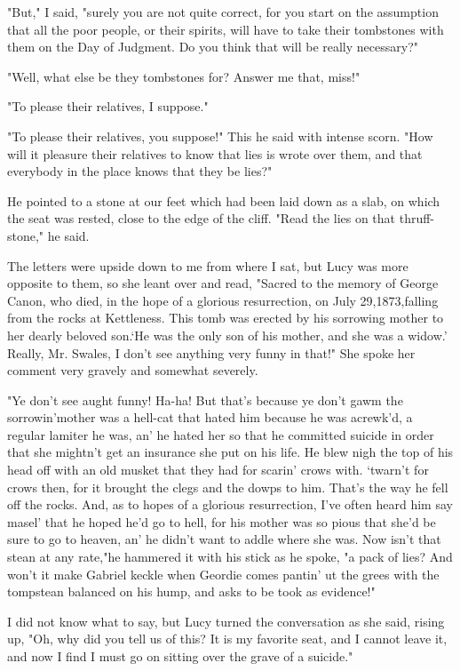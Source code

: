 "But," I said, "surely you are not quite correct, for you start on the assumption that all the poor people, or their spirits, will have to take their tombstones with them on the Day of Judgment. Do you think that will be really necessary?" 

"Well, what else be they tombstones for? Answer me that, miss!" 

"To please their relatives, I suppose." 

"To please their relatives, you suppose!" This he said with intense scorn. "How will it pleasure their relatives to know that lies is wrote over them, and that everybody in the place knows that they be lies?" 

He pointed to a stone at our feet which had been laid down as a slab, on which the seat was rested, close to the edge of the cliff. "Read the lies on that thruff-stone," he said. 

The letters were upside down to me from where I sat, but Lucy was more opposite to them, so she leant over and read, "Sacred to the memory of George Canon, who died, in the hope of a glorious resurrection, on July 29,1873,falling from the rocks at Kettleness. This tomb was erected by his sorrowing mother to her dearly beloved son.`He was the only son of his mother, and she was a widow.' Really, Mr. Swales, I don't see anything very funny in that!" She spoke her comment very gravely and somewhat severely. 

"Ye don't see aught funny! Ha-ha! But that's because ye don't gawm the sorrowin'mother was a hell-cat that hated him because he was acrewk'd, a regular lamiter he was, an' he hated her so that he committed suicide in order that she mightn't get an insurance she put on his life. He blew nigh the top of his head off with an old musket that they had for scarin' crows with. `twarn't for crows then, for it brought the clegs and the dowps to him. That's the way he fell off the rocks. And, as to hopes of a glorious resurrection, I've often heard him say masel' that he hoped he'd go to hell, for his mother was so pious that she'd be sure to go to heaven, an' he didn't want to addle where she was. Now isn't that stean at any rate,"he hammered it with his stick as he spoke, "a pack of lies? And won't it make Gabriel keckle when Geordie comes pantin' ut the grees with the tompstean balanced on his hump, and asks to be took as evidence!" 

I did not know what to say, but Lucy turned the conversation as she said, rising up, "Oh, why did you tell us of this? It is my favorite seat, and I cannot leave it, and now I find I must go on sitting over the grave of a suicide." 

